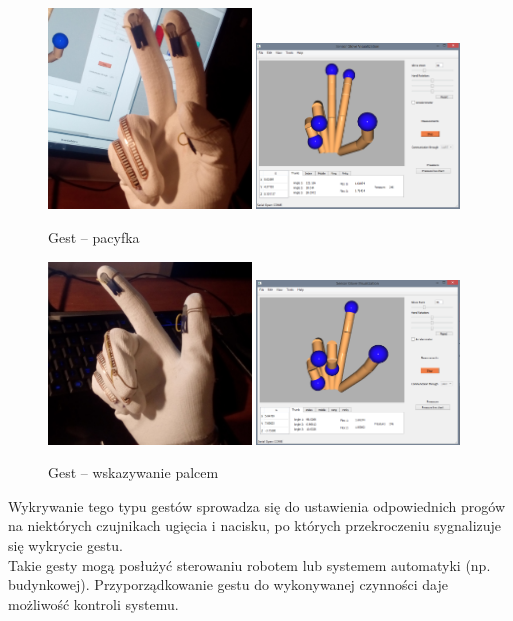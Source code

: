 \documentclass[10pt,a4paper]{article}
\begin{document}
\begin{figure}[!htb]
\centering
    \subfloat
    {
      \includegraphics[width=0.48\textwidth]{./Peace.jpg}
    }
    \subfloat
    {
      \includegraphics[width=0.48\textwidth]{./PeaceQt.png}
    }
    \caption{Gest -- pacyfka\label{fig:Peace}}
\end{figure}
\begin{figure}[!htb]
\centering
    \subfloat
    {
      \includegraphics[width=0.48\textwidth]{./Point.jpg}
    }
    \subfloat
    {
      \includegraphics[width=0.48\textwidth]{./PointQt.png}
    }
    \caption{Gest -- wskazywanie palcem \label{fig:Point}}
\end{figure}
Wykrywanie tego typu gestów sprowadza się do ustawienia odpowiednich progów na niektórych czujnikach ugięcia i nacisku, po których przekroczeniu sygnalizuje się wykrycie gestu.\\
Takie gesty mogą posłużyć sterowaniu robotem lub systemem automatyki (np. budynkowej). Przyporządkowanie gestu do wykonywanej czynności daje możliwość kontroli systemu.
\end{document}

